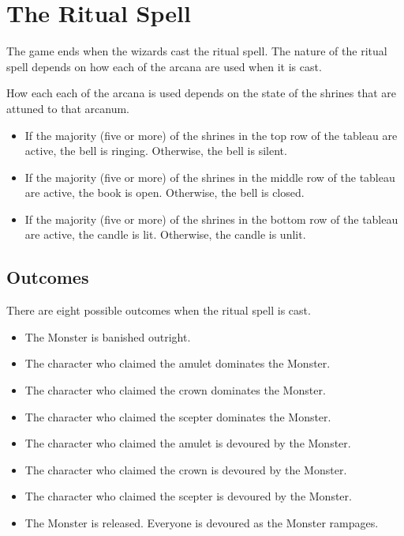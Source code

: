 \documentclass[10pt, parskip=half-, twoside]{scrartcl}
\begin{document}
\newpage

\section*{The Ritual Spell}
The game ends when the wizards cast the ritual spell. The nature of the ritual spell depends on how each of the arcana are used when it is cast.

How each each of the arcana is used depends on the state of the shrines that are attuned to that arcanum.
\begin{itemize}
\item If the majority (five or more) of the shrines in the top row of the tableau are active, the bell is ringing. Otherwise, the bell is silent.
\item If the majority (five or more) of the shrines in the middle row of the tableau are active, the book is open. Otherwise, the bell is closed.
\item If the majority (five or more) of the shrines in the bottom row of the tableau are active, the candle is lit. Otherwise, the candle is unlit.
\end{itemize}

\subsection*{Outcomes}
There are eight possible outcomes when the ritual spell is cast.
\begin{itemize}
\item The Monster is banished outright.
\item The character who claimed the amulet dominates the Monster.%
\item The character who claimed the crown dominates the Monster.%
\item The character who claimed the scepter dominates the Monster.%
\item The character who claimed the amulet is devoured by the Monster.%
\item The character who claimed the crown is devoured by the Monster. %
\item The character who claimed the scepter is devoured by the Monster.%
\item The Monster is released. Everyone is devoured as the Monster rampages.
\end{itemize}
\newpage
\end{document}
